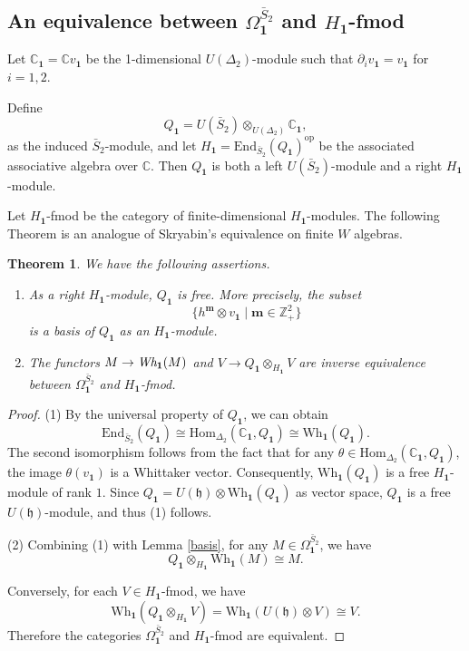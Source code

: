 \documentclass[12pt,a4paper]{amsart}
\newtheorem{Theorem}{Theorem}[section]
\def\bm{\mathbf{m}}
\def\m1{\mathbf{1}}
\begin{document}
\subsection{An equivalence between $\Omega^{\bar{S}_2}_{\mathbf{1}}$ and $H_{\m1}$-fmod}

Let $\mathbb{C}_{\m1}=\mathbb{C}v_{\m1}$ be the 1-dimensional $U(\Delta_2)$-module such that $\partial_{i}v_{\m1}=v_{\m1}$ for $i=1,2$.

Define
$$Q_{\m1}=U(\bar{S}_2)\otimes_{U(\Delta_2)} \mathbb{C}_{\m1},$$
as the induced $\bar{S}_2$-module, and let $H_{\m1}=\text{End}_{\bar{S}_2}(Q_{\m1})^{\text{op}}$ be the associated associative algebra over $\mathbb{C}$. Then $Q_{\m1}$ is both a left $U(\bar{S}_2)$-module and a right $H_{\m1}$-module.

Let $H_{\m1}$-fmod be the category of finite-dimensional $H_{\m1}$-modules.
The following Theorem is an analogue of Skryabin's equivalence \cite{Pr} on finite $W$ algebras.

\begin{Theorem} \label{sk}
We have the following assertions.
\begin{enumerate}
\item As a right $H_{\m1}$-module, $Q_{\m1}$ is free. More precisely, the subset
$$\{h^{\bm}\otimes v_{\m1} \mid \bm\in \mathbb{Z}^{2}_{+}\}$$
is a basis of $Q_{\m1}$ as an $H_{\m1}$-module.

\item The functors $M \rightarrow \emph{Wh}_{\m1}(M)$ and $V \rightarrow Q_{\m1}\otimes_{H_{\m1}}V$ are inverse equivalence between $\Omega^{\bar{S}_2}_{\m1}$ and $H_{\m1}$-\emph{fmod}.
\end{enumerate}
\end{Theorem}

\begin{proof} (1) By the universal property of $Q_{\m1}$, we can obtain
$$\text{End}_{\bar{S}_2}(Q_{\m1}) \cong \text{Hom}_{\Delta_2}(\mathbb{C}_{\m1}, Q_{\m1}) \cong \text{Wh}_{\m1}(Q_\m1).$$
The second isomorphism follows from the fact that  for any $\theta \in \text{Hom}_{\Delta_2}(\mathbb{C}_{\m1}, Q_{\m1})$,  the image $\theta(v_{\m1})$ is a Whittaker vector.
Consequently, $\text{Wh}_{\m1}(Q_{\m1})$ is a free $H_{\m1}$-module of rank $1$. Since $Q_{\m1}=U(\mathfrak{h})\otimes\text{Wh}_{\m1}(Q_{\m1})$ as vector space, $Q_{\m1}$ is a free $U(\mathfrak{h})$-module,  and thus (1) follows.

(2) Combining (1) with Lemma \ref{basis}, for any $ M\in \Omega^{\bar{S}_2}_{\m1}$, we have
$$Q_{\m1} \otimes_{H_{\m1}}\text{Wh}_{\m1}(M) \cong M.$$

Conversely, for each $V \in H_{\m1}$-fmod, we have
$$\text{Wh}_{\m1}(Q_{\m1}\otimes_{H_{\m1}}V)
=\text{Wh}_{\m1}(U(\mathfrak{h})\otimes V) \cong V.$$
Therefore the categories $\Omega^{\bar{S}_2}_{\m1}$ and $H_{\m1}$-fmod are equivalent.
\end{proof}
\end{document}
